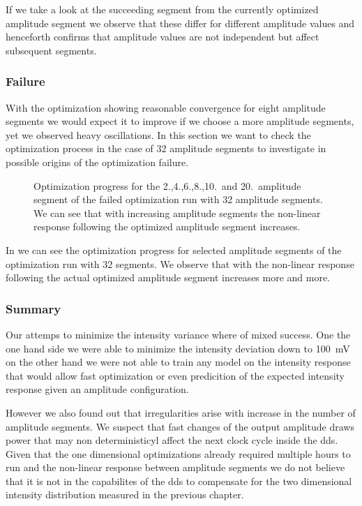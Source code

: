 If we take a look at the succeeding segment from the currently optimized
amplitude segment we observe that these differ for different amplitude
values and henceforth confirms that amplitude values are not independent but
affect subsequent segments.

\subsubsection{Failure}

With the optimization showing reasonable convergence for eight amplitude
segments we would expect it to improve if we choose a more amplitude segments,
yet we observed heavy oscillations. In this section we want to check the
optimization process in the case of 32 amplitude segments to investigate in
possible origins of the optimization failure.
\begin{figure}[htb]
  \centering
  \begin{adjustbox}{width=\textwidth}
  \end{adjustbox}
  \caption{Optimization progress for the 2.,4.,6.,8.,10.\ and 20.\ amplitude
    segment of the failed optimization run with 32 amplitude segments. We can
    see that with increasing amplitude segments the non-linear response
    following the optimized amplitude segment increases.
  }\label{fig:intensity_optimization_failure}
\end{figure}
In  we can see the optimization
progress for selected amplitude segments of the optimization run with 32
segments. We observe that with the non-linear response following the actual
optimized amplitude segment increases more and more.

\subsubsection{Summary}

Our attemps to minimize the intensity variance where of mixed success. One
the one hand side we were able to minimize the intensity deviation down
to \SI{100}{\milli\volt} on the other hand we were not able to train any
model on the intensity response that would allow fast optimization or even
predicition of the expected intensity response given an amplitude
configuration.

However we also found out that irregularities arise with increase in the
number of amplitude segments. We suspect that fast changes of the output
amplitude draws power that may non deterministicyl affect the next clock
cycle inside the \gls{dds}. Given that the one dimensional optimizations
already required multiple hours to run and the non-linear response between
amplitude segments we do not believe that it is not in the capabilites of the
\gls{dds} to compensate for the two dimensional intensity distribution
measured in the previous chapter.
